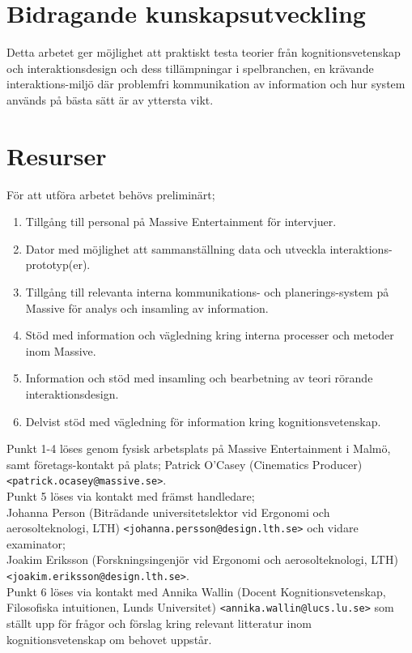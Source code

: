 \documentclass{article}
\begin{document}
\section*{Bidragande kunskapsutveckling}

  Detta arbetet ger möjlighet att praktiskt testa teorier från
  kognitionsvetenskap och interaktionsdesign och dess tillämpningar i
  spelbranchen, en krävande interaktions-miljö där problemfri kommunikation av
  information och hur system används på bästa sätt är av yttersta vikt.

\section*{Resurser}

  För att utföra arbetet behövs preliminärt;
  \begin{enumerate}
    \item{Tillgång till personal på Massive Entertainment för intervjuer.}
    \item{Dator med möjlighet att sammanställning data och utveckla
        interaktions-prototyp(er).}
    \item{Tillgång till relevanta interna kommunikations- och planerings-system
        på Massive för analys och insamling av information.}
    \item{Stöd med information och vägledning kring interna processer och
        metoder inom Massive.}
    \item{Information och stöd med insamling och bearbetning av teori rörande
        interaktionsdesign.}
    \item{Delvist stöd med vägledning för information kring
        kognitionsvetenskap.}
  \end{enumerate}

  Punkt 1-4 löses genom fysisk arbetsplats på Massive Entertainment i Malmö,
  samt företags-kontakt på plats; Patrick O'Casey (Cinematics Producer) \\
  \texttt{<patrick.ocasey@massive.se>}. \\

  Punkt 5 löses via kontakt med främst handledare; \\
  Johanna Person (Biträdande universitetslektor vid Ergonomi och
  aerosolteknologi, LTH) \texttt{<johanna.persson@design.lth.se>} och vidare
  examinator;
  \\Joakim Eriksson (Forskningsingenjör vid Ergonomi och aerosolteknologi, LTH)
  \texttt{<joakim.eriksson@design.lth.se>}. \\

  Punkt 6 löses via kontakt med Annika Wallin (Docent Kognitionsvetenskap,
  Filosofiska intuitionen, Lunds Universitet)
  \texttt{<annika.wallin@lucs.lu.se>} som ställt upp för frågor och förslag
  kring relevant litteratur inom kognitionsvetenskap om behovet uppstår.



\end{document}
